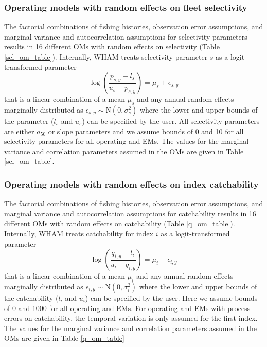 \documentclass[
  12pt,
]{article}
\begin{document}
\hypertarget{operating-models-with-random-effects-on-fleet-selectivity}{%
\subsubsection*{Operating models with random effects on fleet
selectivity}\label{operating-models-with-random-effects-on-fleet-selectivity}}

The factorial combinations of fishing histories, observation error
assumptions, and marginal variance and autocorrelation assumptions for
selectivity parameters results in 16 different OMs with random effects
on selectivity (Table \ref{sel_om_table}). Internally, WHAM treats
selectivity parameter \(s\) as a logit-transformed parameter \[
\log\left(\frac{p_{s,y}-l_{s}}{u_{s}-p_{s,y}}\right) = \mu_s + \epsilon_{s,y}
\] that is a linear combination of a mean \(\mu_s\) and any annual
random effects marginally distributed as
\(\epsilon_{s,y} \sim \text{N}\left(0,\sigma_s^2\right)\) where the
lower and upper bounds of the parameter (\(l_s\) and \(u_s\)) can be
specified by the user. All selectivity parameters are either \(a_50\) or
slope parameters and we assume bounds of 0 and 10 for all selectivity
parameters for all operating and EMs. The values for the marginal
variance and correlation parameters assumed in the OMs are given in
Table \ref{sel_om_table}.

\hypertarget{operating-models-with-random-effects-on-index-catchability}{%
\subsubsection*{Operating models with random effects on index
catchability}\label{operating-models-with-random-effects-on-index-catchability}}

The factorial combinations of fishing histories, observation error
assumptions, and marginal variance and autocorrelation assumptions for
catchability results in 16 different OMs with random effects on
catchability (Table \ref{q_om_table}). Internally, WHAM treats
catchability for index \(i\) as a logit-transformed parameter \[
\log\left(\frac{q_{i,y}-l_{i}}{u_{i}-q_{i,y}}\right) = \mu_i + \epsilon_{i,y}
\] that is a linear combination of a mean \(\mu_i\) and any annual
random effects marginally distributed as
\(\epsilon_{i,y} \sim \text{N}\left(0,\sigma_i^2\right)\) where the
lower and upper bounds of the catchability (\(l_i\) and \(u_i\)) can be
specified by the user. Here we assume bounds of 0 and 1000 for all
operating and EMs. For operating and EMs with process errors on
catchability, the temporal variation is only assumed for the first
index. The values for the marginal variance and correlation parameters
assumed in the OMs are given in Table \ref{q_om_table}
\end{document}
